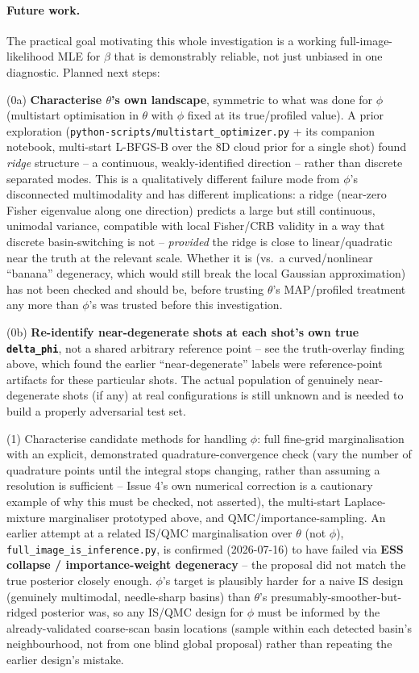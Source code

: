\documentclass[11pt,a4paper]{article}
\newcommand{\code}[1]{\texttt{#1}}
\begin{document}
\paragraph{Future work.} The practical goal motivating this whole
investigation is a working full-image-likelihood MLE for $\beta$ that is
demonstrably reliable, not just unbiased in one diagnostic. Planned next
steps:

(0a) \textbf{Characterise $\theta$'s own landscape}, symmetric to what was
done for $\phi$ (multistart optimisation in $\theta$ with $\phi$ fixed at
its true/profiled value). A prior exploration
(\code{python-scripts/multistart\_optimizer.py} + its companion notebook,
multi-start L-BFGS-B over the 8D cloud prior for a single shot) found
\emph{ridge} structure -- a continuous, weakly-identified direction --
rather than discrete separated modes. This is a qualitatively different
failure mode from $\phi$'s disconnected multimodality and has different
implications: a ridge (near-zero Fisher eigenvalue along one direction)
predicts a large but still continuous, unimodal variance, compatible with
local Fisher/CRB validity in a way that discrete basin-switching is not --
\emph{provided} the ridge is close to linear/quadratic near the truth at
the relevant scale. Whether it is (vs.\ a curved/nonlinear ``banana''
degeneracy, which would still break the local Gaussian approximation) has
not been checked and should be, before trusting $\theta$'s MAP/profiled
treatment any more than $\phi$'s was trusted before this investigation.

(0b) \textbf{Re-identify near-degenerate shots at each shot's own true
\code{delta\_phi}}, not a shared arbitrary reference point -- see the
truth-overlay finding above, which found the earlier ``near-degenerate''
labels were reference-point artifacts for these particular shots. The
actual population of genuinely near-degenerate shots (if any) at real
configurations is still unknown and is needed to build a properly
adversarial test set.

(1) Characterise candidate methods for handling $\phi$: full fine-grid
marginalisation with an explicit, demonstrated quadrature-convergence
check (vary the number of quadrature points until the integral stops
changing, rather than assuming a resolution is sufficient -- Issue 4's own
numerical correction is a cautionary example of why this must be checked,
not asserted), the multi-start Laplace-mixture marginaliser prototyped
above, and QMC/importance-sampling. An earlier attempt at a related
IS/QMC marginalisation over $\theta$ (not $\phi$),
\code{full\_image\_is\_inference.py}, is confirmed (2026-07-16) to have
failed via \textbf{ESS collapse / importance-weight degeneracy} -- the
proposal did not match the true posterior closely enough. $\phi$'s target
is plausibly harder for a naive IS design (genuinely multimodal,
needle-sharp basins) than $\theta$'s presumably-smoother-but-ridged
posterior was, so any IS/QMC design for $\phi$ must be informed by the
already-validated coarse-scan basin locations (sample within each detected
basin's neighbourhood, not from one blind global proposal) rather than
repeating the earlier design's mistake.
\end{document}
